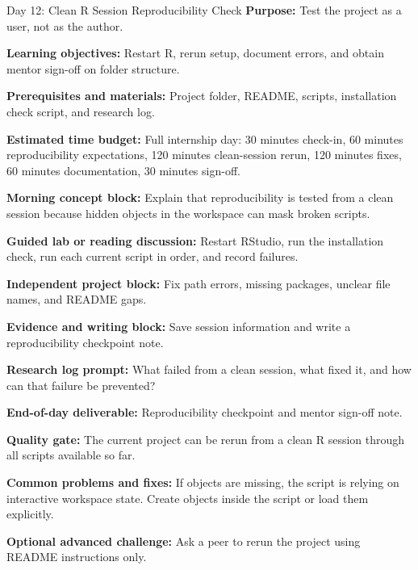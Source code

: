 \begin{dailybox}{Day 12: Clean R Session Reproducibility Check}
\textbf{Purpose:} Test the project as a user, not as the author.

\textbf{Learning objectives:} Restart R, rerun setup, document errors, and obtain mentor sign-off on folder structure.

\textbf{Prerequisites and materials:} Project folder, README, scripts, installation check script, and research log.

\textbf{Estimated time budget:} Full internship day: 30 minutes check-in, 60 minutes reproducibility expectations, 120 minutes clean-session rerun, 120 minutes fixes, 60 minutes documentation, 30 minutes sign-off.

\textbf{Morning concept block:} Explain that reproducibility is tested from a clean session because hidden objects in the workspace can mask broken scripts.

\textbf{Guided lab or reading discussion:} Restart RStudio, run the installation check, run each current script in order, and record failures.

\textbf{Independent project block:} Fix path errors, missing packages, unclear file names, and README gaps.

\textbf{Evidence and writing block:} Save session information and write a reproducibility checkpoint note.

\textbf{Research log prompt:} What failed from a clean session, what fixed it, and how can that failure be prevented?

\textbf{End-of-day deliverable:} Reproducibility checkpoint and mentor sign-off note.

\textbf{Quality gate:} The current project can be rerun from a clean R session through all scripts available so far.

\textbf{Common problems and fixes:} If objects are missing, the script is relying on interactive workspace state. Create objects inside the script or load them explicitly.

\textbf{Optional advanced challenge:} Ask a peer to rerun the project using README instructions only.
\end{dailybox}

